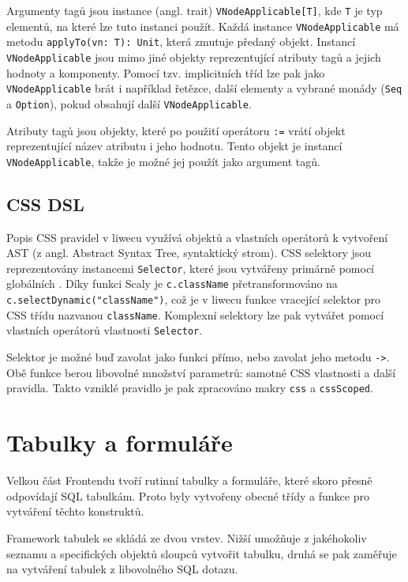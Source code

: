 Argumenty tagů jsou instance  (angl. trait)
\texttt{VNode\-Applicable[T]}, kde \texttt{T} je typ elementů, na které lze tuto
instanci použít. Každá instance \texttt{VNode\-Applicable} má metodu
\texttt{applyTo(vn: T): Unit}, která zmutuje předaný objekt. Instancí
\texttt{VNode\-Applicable} jsou mimo jiné objekty reprezentující atributy tagů a
jejich hodnoty a komponenty. Pomocí tzv. implicitních tříd lze pak jako
\texttt{VNode\-Applicable} brát i například řetězce, další elementy a vybrané
monády (\texttt{Seq} a \texttt{Option}), pokud obsahují další
\texttt{VNode\-Applicable}.

Atributy tagů jsou objekty, které po použití operátoru \texttt{:=} vrátí objekt
reprezentující název atributu i jeho hodnotu. Tento objekt je instancí
\texttt{VNode\-Applicable}, takže je možné jej použít jako argument tagů.

\subsection{CSS DSL}

Popis CSS pravidel v liwecu využívá objektů a vlastních operátorů k vytvoření
AST (z angl. Abstract Syntax Tree, syntaktický strom). CSS selektory jsou
reprezentovány instancemi \texttt{Selector}, které jsou vytvářeny primárně
pomocí globálních . Díky funkci Scaly je
\texttt{c.className} přetransformováno na \texttt{c.selectDynamic("className")},
což je v liwecu funkce vracející selektor pro CSS třídu nazvanou
\texttt{className}. Komplexní selektory lze pak vytvářet pomocí vlastních
operátorů vlastnosti \texttt{Selector}.

Selektor je možné buď zavolat jako funkci přímo, nebo zavolat jeho metodu
\texttt{->}. Obě funkce berou libovolné množství parametrů: samotné CSS
vlastnosti a další pravidla. Takto vzniklé pravidlo je pak zpracováno makry
\texttt{css} a \texttt{cssScoped}.

\section{Tabulky a formuláře}

Velkou část Frontendu tvoří rutinní tabulky a formuláře, které skoro přesně
odpovídají SQL tabulkám. Proto byly vytvořeny obecné třídy a funkce pro
vytváření těchto konstruktů.

Framework tabulek se skládá ze dvou vrstev. Nižší umožňuje z jakéhokoliv seznamu
a specifických objektů sloupců vytvořit tabulku, druhá se pak zaměřuje na
vytváření tabulek z libovolného SQL dotazu.

